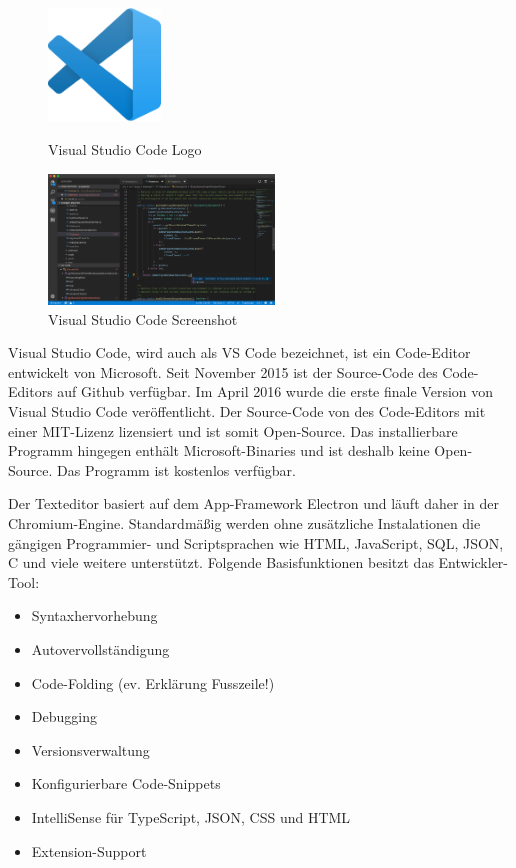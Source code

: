 \begin{figure}[htb]
    \begin{center}
        \includegraphics[width=3cm] {./pics/Visual_Studio_Code_1.35_icon.svg.png}
        \caption{Visual Studio Code Logo}
        \includegraphics[width=6cm]{./pics/VS_Code_1.36.0-insider.png}
        \caption{Visual Studio Code Screenshot}
    \end{center}
\end{figure}

Visual Studio Code, wird auch als VS Code bezeichnet, ist ein Code-Editor entwickelt von Microsoft. 
Seit November 2015 ist der Source-Code des Code-Editors auf Github verfügbar. Im April 2016 wurde die erste finale Version 
von Visual Studio Code veröffentlicht. Der Source-Code von des Code-Editors mit einer MIT-Lizenz lizensiert und ist somit Open-Source.
Das installierbare Programm hingegen enthält Microsoft-Binaries und ist deshalb keine Open-Source. Das Programm ist kostenlos verfügbar.

Der Texteditor basiert auf dem App-Framework Electron und läuft daher in der Chromium-Engine. Standardmäßig werden ohne zusätzliche Instalationen
die gängigen Programmier- und Scriptsprachen wie HTML, JavaScript, SQL, JSON, C und viele weitere unterstützt. 
Folgende Basisfunktionen besitzt das Entwickler-Tool:

\begin{itemize}
    \item Syntaxhervorhebung
    \item Autovervollständigung
    \item Code-Folding (ev. Erklärung Fusszeile!)
    \item Debugging
    \item Versionsverwaltung
    \item Konfigurierbare Code-Snippets
    \item IntelliSense für TypeScript, JSON, CSS und HTML
    \item Extension-Support
\end{itemize}

